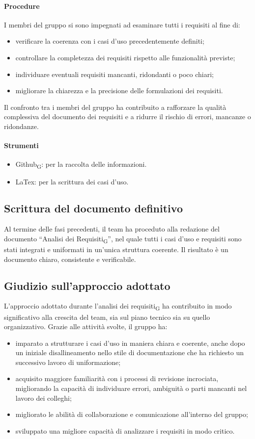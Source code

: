 \documentclass[11pt,a4paper]{article}
\newcommand{\gls}[1]{#1\textsubscript{G}}
\begin{document}
\paragraph{Procedure}
I membri del gruppo si sono impegnati ad esaminare tutti i requisiti al fine di:
\begin{itemize}
\item verificare la coerenza con i casi d’uso precedentemente definiti;
\item controllare la completezza dei requisiti rispetto alle funzionalità previste;
\item individuare eventuali requisiti mancanti, ridondanti o poco chiari;
\item migliorare la chiarezza e la precisione delle formulazioni dei requisiti.
\end{itemize}
Il confronto tra i membri del gruppo ha contribuito a rafforzare la qualità complessiva del documento dei requisiti e a ridurre il rischio di errori, mancanze o ridondanze.

\paragraph{Strumenti}
\begin{itemize}
\item \gls{Github}: per la raccolta delle informazioni.
\item LaTex: per la scrittura dei casi d'uso.
\end{itemize}

\subsection{Scrittura del documento definitivo}
Al termine delle fasi precedenti, il team ha proceduto alla redazione del documento “\gls{Analisi dei Requisiti}”, nel quale tutti i casi d’uso e requisiti sono stati integrati e uniformati in un’unica struttura coerente. Il risultato è un documento chiaro, consistente e verificabile.

\subsection{Giudizio sull'approccio adottato}
L’approccio adottato durante l’\gls{analisi dei requisiti} ha contribuito in modo significativo alla crescita del team, sia sul piano tecnico sia su quello organizzativo. Grazie alle attività svolte, il gruppo ha:
\begin{itemize}
\item imparato a strutturare i casi d’uso in maniera chiara e coerente, anche dopo un iniziale disallineamento nello stile di documentazione che ha richiesto un successivo lavoro di uniformazione;
\item acquisito maggiore familiarità con i processi di revisione incrociata, migliorando la capacità di individuare errori, ambiguità o parti mancanti nel lavoro dei colleghi;
\item migliorato le abilità di collaborazione e comunicazione all'interno del gruppo;
\item sviluppato una migliore capacità di analizzare i requisiti in modo critico.
\end{itemize}
\end{document}

